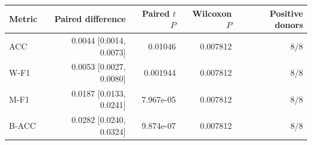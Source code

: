 \begin{tabular}{lrrrr}
\toprule
Metric & Paired difference & Paired $t$ $P$ & Wilcoxon $P$ & Positive donors \\
\midrule
ACC & 0.0044 [0.0014, 0.0073] & 0.01046 & 0.007812 & 8/8 \\
W-F1 & 0.0053 [0.0027, 0.0080] & 0.001944 & 0.007812 & 8/8 \\
M-F1 & 0.0187 [0.0133, 0.0241] & 7.967e-05 & 0.007812 & 8/8 \\
B-ACC & 0.0282 [0.0240, 0.0324] & 9.874e-07 & 0.007812 & 8/8 \\
\bottomrule
\end{tabular}
